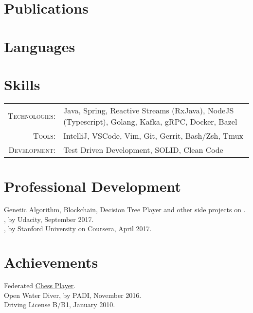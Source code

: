 \section{Publications}

\newpage

\section{Languages}

\section{Skills}
\begin{tabular}{r p{12.5cm}}
\textsc{Technologies:} & Java, Spring, Reactive Streams (RxJava), NodeJS (Typescript), Golang, Kafka, gRPC, Docker, Bazel\\
\textsc{Tools:} & IntelliJ, VSCode, Vim, Git, Gerrit, Bash/Zsh, Tmux\\
\textsc{Development:} & Test Driven Development, SOLID, Clean Code
\end{tabular}

\section{Professional Development}
\noindent
\bulletText Genetic Algorithm, Blockchain, Decision Tree Player and other side projects on \gitHubNoUrl{}.\\
\bulletText \certificateFE{}, by Udacity, September 2017.\\
\bulletText \certificateML{}, by Stanford University on Coursera, April 2017. %

\section{Achievements}
\noindent
\bulletText Federated \href{http://ratings.fide.com/card.phtml?event=1958720}{Chess Player}.\\
\bulletText Open Water Diver, by PADI, November 2016.\\
\bulletText Driving License B/B1, January 2010.
